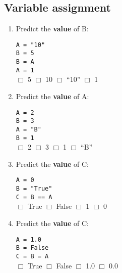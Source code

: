 \documentclass[11pt]{report}
\begin{document}
\subsection*{Variable assignment}
\begin{enumerate}


    \item Predict the \textbf{value} of B:

    {\tt A = "10"}\\
    {\tt B = 5}\\
    {\tt B = A}\\
    {\tt A = 1}\\
    $\Box$ 5 \hspace{3em} $\Box$ 10 \hspace{3em} $\Box$ ``10'' \hspace{3em} $\Box$ 1

    \item Predict the \textbf{value} of A:

    {\tt A = 2}\\
    {\tt B = 3}\\
    {\tt A = "B"}\\
    {\tt B = 1}\\
    $\Box$ 2 \hspace{3em} $\Box$ 3 \hspace{3em} $\Box$ 1 \hspace{3em} $\Box$ ``B''

    \item Predict the \textbf{value} of C:

    {\tt A = 0}\\
    {\tt B = "True"}\\
    {\tt C = B == A}\\
    $\Box$ True \hspace{3em} $\Box$ False \hspace{3em} $\Box$ 1 \hspace{3em} $\Box$ 0

    \item Predict the \textbf{value} of C:

    {\tt A = 1.0}\\
    {\tt B = False}\\
    {\tt C = B = A}\\
    $\Box$ True \hspace{3em} $\Box$ False \hspace{3em} $\Box$ 1.0 \hspace{3em} $\Box$ 0.0


\end{enumerate}
\end{document}
